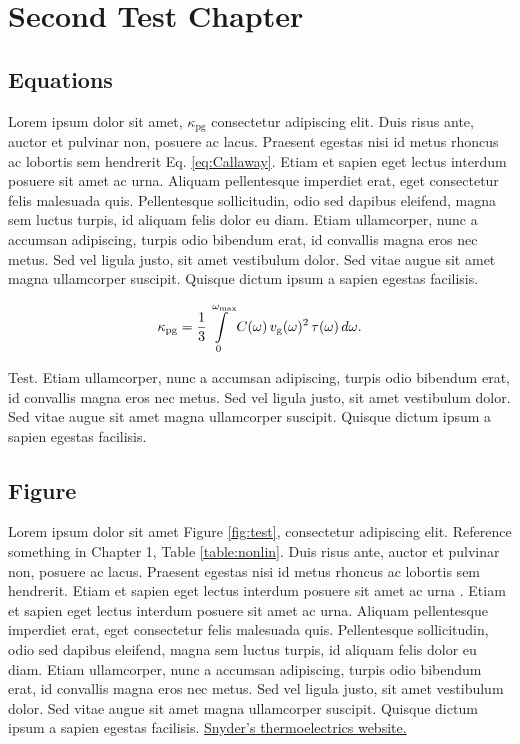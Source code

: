 \chapter{Second Test Chapter}

\section{Equations}
Lorem ipsum dolor sit amet, $\kappa_\mathrm{pg}$
consectetur adipiscing elit. Duis risus ante, auctor et pulvinar non, posuere ac lacus. Praesent egestas nisi id metus rhoncus ac lobortis sem hendrerit Eq. \ref{eq:Callaway}. Etiam et sapien eget lectus interdum posuere sit amet ac urna. Aliquam pellentesque imperdiet erat, eget consectetur felis malesuada quis. Pellentesque sollicitudin, odio sed dapibus eleifend, magna sem luctus turpis, id aliquam felis dolor eu diam. Etiam ullamcorper, nunc a accumsan adipiscing, turpis odio bibendum erat, id convallis magna eros nec metus. Sed vel ligula justo, sit amet vestibulum dolor. Sed vitae augue sit amet magna ullamcorper suscipit. Quisque dictum ipsum a sapien egestas facilisis. 

\begin{equation}
  \kappa_\mathrm{pg}=\frac{1}{3} \intop _0 ^{\omega_\mathrm{max}} C(\omega) \, v_\mathrm{g}(\omega)^2 \, \tau(\omega) \, d\omega. \label{eq:Callaway}
\end{equation}

Test. Etiam ullamcorper, nunc a accumsan adipiscing, turpis odio bibendum erat, id convallis magna eros nec metus. Sed vel ligula justo, sit amet vestibulum dolor. Sed vitae augue sit amet magna ullamcorper suscipit. Quisque dictum ipsum a sapien egestas facilisis. 

\section{Figure}
\noindent Lorem ipsum dolor sit amet Figure \ref{fig:test}, consectetur adipiscing elit. Reference something in Chapter 1, Table \ref{table:nonlin}. Duis risus ante, auctor et pulvinar non, posuere ac lacus. Praesent egestas nisi id metus rhoncus ac lobortis sem hendrerit. Etiam et sapien eget lectus interdum posuere sit amet ac urna \citep{latex:companion}. Etiam et sapien eget lectus interdum posuere sit amet ac urna. Aliquam pellentesque imperdiet erat, eget consectetur felis malesuada quis. Pellentesque sollicitudin, odio sed dapibus eleifend, magna sem luctus turpis, id aliquam felis dolor eu diam. Etiam ullamcorper, nunc a accumsan adipiscing, turpis odio bibendum erat, id convallis magna eros nec metus. Sed vel ligula justo, sit amet vestibulum dolor. Sed vitae augue sit amet magna ullamcorper suscipit. Quisque dictum ipsum a sapien egestas facilisis. \href{http://thermoelectrics.matsci.northwestern.edu/}{Snyder's thermoelectrics website.}

